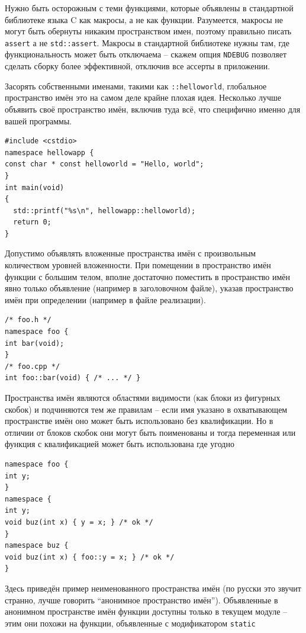 \documentclass[a4paper,12pt,oneside]{article}
\begin{document}
Нужно быть осторожным с теми функциями, которые объявлены в стандартной библиотеке языка C как макросы, а не как функции. Разумеется, макросы не могут быть обернуты никаким пространством имен, поэтому правильно писать \lstinline!assert! а не \lstinline!std::assert!. Макросы в стандартной библиотеке нужны там, где функциональность может быть отключаема -- скажем опция \lstinline!NDEBUG! позволяет сделать сборку более эффективной, отключив все ассерты в приложении. 

Засорять собственными именами, такими как \lstinline!::helloworld!, глобальное пространство имён это на самом деле крайне плохая идея. Несколько лучше объявить своё пространство имён, включив туда всё, что специфично именно для вашей программы.

\begin{lstlisting}
#include <cstdio>
namespace hellowapp {
const char * const helloworld = "Hello, world";
}
int main(void)
{
  std::printf("%s\n", hellowapp::helloworld);
  return 0;
}
\end{lstlisting}

Допустимо объявлять вложенные пространства имён с произвольным количеством уровней вложенности. При помещении в пространство имён функции с большим телом, вполне достаточно поместить в пространство имён явно только объявление (например в заголовочном файле), указав пространство имён при определении (например в файле реализации).

\begin{lstlisting}
/* foo.h */
namespace foo {
int bar(void);
}
/* foo.cpp */
int foo::bar(void) { /* ... */ }
\end{lstlisting}

Пространства имён являются областями видимости (как блоки из фигурных скобок) и подчиняются тем же правилам – если имя указано в охватывающем пространстве имён оно может быть использовано без квалификации. Но в отличии от блоков скобок они могут быть поименованы и тогда переменная или функция с квалификацией может быть использована где угодно

\begin{lstlisting}
namespace foo {
int y;
}
namespace {
int y;
void buz(int x) { y = x; } /* ok */
}
namespace buz {
void buz(int x) { foo::y = x; } /* ok */
}
\end{lstlisting}

Здесь приведён пример неименованного пространства имён (по русски это звучит странно, лучше говорить ``анонимное пространство имён''). Объявленные в анонимном пространстве имён функции доступны только в текущем модуле -- этим они похожи на функции, объявленные с модификатором \lstinline!static!
\end{document}
